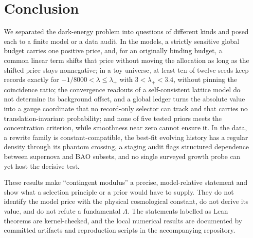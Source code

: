 \hypertarget{conclusion}{%
\section{Conclusion}\label{conclusion}}

We separated the dark-energy problem into questions of different kinds
and posed each to a finite model or a data audit. In the models, a
strictly sensitive global budget carries one positive price, and, for an
originally binding budget, a common linear term shifts that price
without moving the allocation as long as the shifted price stays
nonnegative; in a toy universe, at least ten of twelve seeds keep
records exactly for \(-1/8000<\lambda\le\lambda_+\) with
\(3<\lambda_+<3.4\), without pinning the coincidence ratio; the
convergence readouts of a self-consistent lattice model do not determine
its background offset, and a global ledger turns the absolute value into
a gauge coordinate that no record-only selector can track and that
carries no translation-invariant probability; and none of five tested
priors meets the concentration criterion, while smoothness near zero
cannot ensure it. In the data, a rewrite family is constant-compatible,
the best-fit evolving history has a regular density through its phantom
crossing, a staging audit flags structured dependence between supernova
and BAO subsets, and no single surveyed growth probe can yet host the
decisive test.

These results make ``contingent modulus'' a precise, model-relative
statement and show what a selection principle or a prior would have to
supply. They do not identify the model price with the physical
cosmological constant, do not derive its value, and do not refute a
fundamental \(\Lambda\). The statements labelled as Lean theorems are
kernel-checked, and the local numerical results are documented by
committed artifacts and reproduction scripts in the accompanying
repository.
